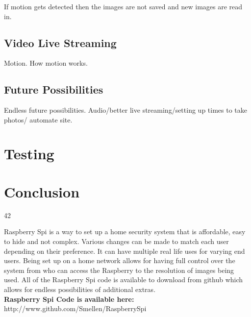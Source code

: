 \documentclass[]{report}
\begin{document}
If motion gets detected then the images are not saved and new images are read in.\\ 

\section {Video Live Streaming}
\label {sec:video}
Motion. How motion works.

\section {Future Possibilities}
\label {sec:future}
Endless future possibilities. Audio/better live streaming/setting up times to take photos/ automate site.

\chapter {Testing}
\label {ch:test}
%
%
%
%
%
\chapter {Conclusion}
\label {ch:concl}
%
%
42
%
%
\begin {small}
Raspberry Spi is a way to set up a home security system that is affordable, easy to hide and not complex. Various changes can be made to match each user depending on their preference. It can have multiple real life uses for varying end users. Being set up on a home network allows for having full control over the system from who can access the Raspberry to the resolution of images being used. All of the Raspberry Spi code is available to download from github which allows for endless possibilities of additional extras.\\

\noindent
{\bf Raspberry Spi Code is available here:}\\
{http://www.github.com/Smellen/RaspberrySpi}
\end{small}

\end{document}
